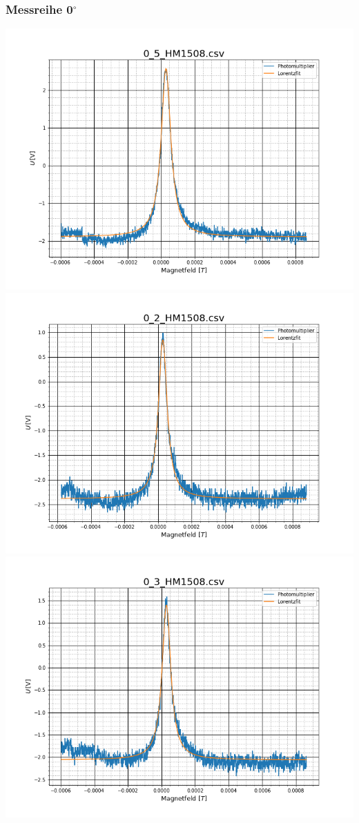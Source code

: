 \subsubsection{Messreihe 0$^\circ$}
\includegraphics[scale=0.3]{Bild/Anhang/Abkuhlung_1/abk_2_01}
\includegraphics[scale=0.3]{Bild/Anhang/Abkuhlung_1/abk_2_02}\\
\includegraphics[scale=0.3]{Bild/Anhang/Abkuhlung_1/abk_2_03}
